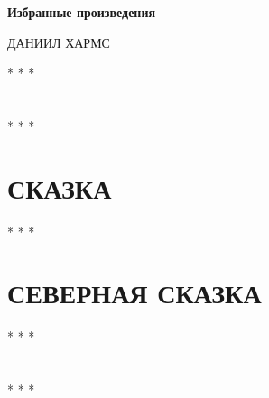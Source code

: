 \documentclass[a4paper,12pt,openany]{book}  %
\begin{document}
\pagestyle{plain}

\begin{center}
{\Large\bfseries Избранные произведения}
\end{center}
\vspace{0.5cm}
\begin{center}
{\large ДАНИИЛ ХАРМС}
\end{center}
\vspace{1cm}

\begin{center}
* * *
\end{center}

\chapter{ }

\vspace{0.3cm}

\begin{center}
* * *
\end{center}

\chapter{СКАЗКА}

\vspace{0.3cm}

\begin{center}
* * *
\end{center}

\chapter{СЕВЕРНАЯ СКАЗКА }

\vspace{0.3cm}

\begin{center}
* * *
\end{center}

\chapter{}

\vspace{0.3cm}

\begin{center}
* * *
\end{center}

\chapter{}

\vspace{0.3cm}
\end{document}
